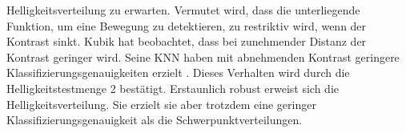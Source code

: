 Helligkeitsverteilung zu erwarten. Vermutet wird, dass die unterliegende Funktion, um eine Bewegung zu detektieren, zu restriktiv wird, wenn der Kontrast sinkt.
\newline
\newline
Kubik hat beobachtet, dass bei zunehmender Distanz der Kontrast geringer wird. Seine KNN haben mit abnehmenden Kontrast geringere Klassifizierungsgenauigkeiten erzielt \cite{kubikThesis}. Dieses Verhalten wird durch die
Helligkeitstestmenge 2 bestätigt. Erstaunlich robust erweist sich die Helligkeitsverteilung. Sie erzielt sie aber trotzdem eine geringer Klassifizierungsgenauigkeit als die Schwerpunktverteilungen.
